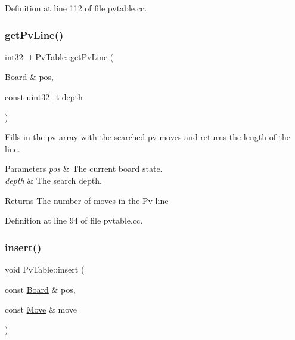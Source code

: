 Definition at line 112 of file pvtable.\+cc.

\mbox{\label{classPvTable_a6e87189dbe8ce348782ad2423ac14b08}} 
\subsubsection{\texorpdfstring{get\+Pv\+Line()}{getPvLine()}}
{\footnotesize\ttfamily int32\+\_\+t Pv\+Table\+::get\+Pv\+Line (\begin{DoxyParamCaption}\item[{\mbox{\hyperlink{classBoard}{Board}} \&}]{pos,  }\item[{const uint32\+\_\+t}]{depth }\end{DoxyParamCaption})\hspace{0.3cm}{\ttfamily [noexcept]}}



Fills in the pv array with the searched pv moves and returns the length of the line. 


\begin{DoxyParams}{Parameters}
{\em pos} & The current board state. \\
\hline
{\em depth} & The search depth. \\
\hline
\end{DoxyParams}
\begin{DoxyReturn}{Returns}
The number of moves in the Pv line 
\end{DoxyReturn}


Definition at line 94 of file pvtable.\+cc.

\mbox{\label{classPvTable_aeb05a7085dcd5f16c35dbb30f152056a}} 
\subsubsection{\texorpdfstring{insert()}{insert()}\hspace{0.1cm}{\footnotesize\ttfamily [1/2]}}
{\footnotesize\ttfamily void Pv\+Table\+::insert (\begin{DoxyParamCaption}\item[{const \mbox{\hyperlink{classBoard}{Board}} \&}]{pos,  }\item[{const \mbox{\hyperlink{classMove}{Move}} \&}]{move }\end{DoxyParamCaption})\hspace{0.3cm}{\ttfamily [noexcept]}}



